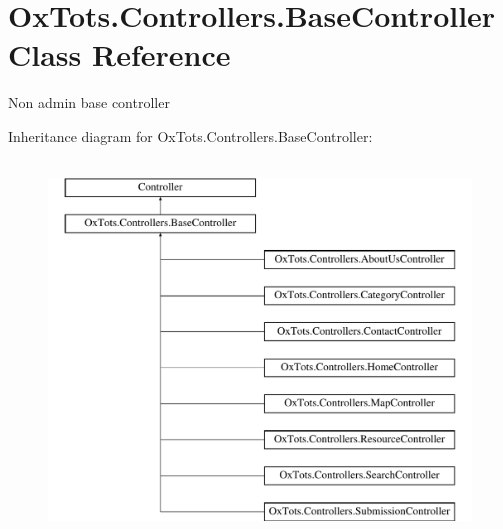 \hypertarget{class_ox_tots_1_1_controllers_1_1_base_controller}{}\section{Ox\+Tots.\+Controllers.\+Base\+Controller Class Reference}
\label{class_ox_tots_1_1_controllers_1_1_base_controller}


Non admin base controller  


Inheritance diagram for Ox\+Tots.\+Controllers.\+Base\+Controller\+:\begin{figure}[H]
\begin{center}
\leavevmode
\includegraphics[height=10.000000cm]{class_ox_tots_1_1_controllers_1_1_base_controller}
\end{center}
\end{figure}
